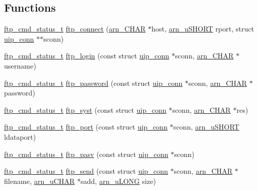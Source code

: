 \subsection*{Functions}
\begin{DoxyCompactItemize}
\item 
\hyperlink{group__ftp_gabd3273961dc774ec260204513c2cea90}{ftp\_\-cmd\_\-status\_\-t} \hyperlink{group__ftp_gad3c366206b639b09543515a6ab6e228e}{ftp\_\-connect} (\hyperlink{group__ftp_gab7c92ee10c15b851350edb8a4a3bb708}{arn\_\-CHAR} $\ast$host, \hyperlink{group__ftp_gaa290e3b930f0eff7f256b787fdbe02dc}{arn\_\-uSHORT} rport, struct \hyperlink{structuip__conn}{uip\_\-conn} $\ast$$\ast$sconn)
\item 
\hyperlink{group__ftp_gabd3273961dc774ec260204513c2cea90}{ftp\_\-cmd\_\-status\_\-t} \hyperlink{group__ftp_ga86522c2e5a4dba5a9213f20c1cb9f31e}{ftp\_\-login} (const struct \hyperlink{structuip__conn}{uip\_\-conn} $\ast$sconn, \hyperlink{group__ftp_gab7c92ee10c15b851350edb8a4a3bb708}{arn\_\-CHAR} $\ast$username)
\item 
\hyperlink{group__ftp_gabd3273961dc774ec260204513c2cea90}{ftp\_\-cmd\_\-status\_\-t} \hyperlink{group__ftp_ga2a15e319137f942818399a1633c536a8}{ftp\_\-password} (const struct \hyperlink{structuip__conn}{uip\_\-conn} $\ast$sconn, \hyperlink{group__ftp_gab7c92ee10c15b851350edb8a4a3bb708}{arn\_\-CHAR} $\ast$password)
\item 
\hyperlink{group__ftp_gabd3273961dc774ec260204513c2cea90}{ftp\_\-cmd\_\-status\_\-t} \hyperlink{group__ftp_gacf99b25830511655f16139c5c4ab73df}{ftp\_\-syst} (const struct \hyperlink{structuip__conn}{uip\_\-conn} $\ast$sconn, \hyperlink{group__ftp_gab7c92ee10c15b851350edb8a4a3bb708}{arn\_\-CHAR} $\ast$res)
\item 
\hyperlink{group__ftp_gabd3273961dc774ec260204513c2cea90}{ftp\_\-cmd\_\-status\_\-t} \hyperlink{group__ftp_ga3dcde404cc2a132e5d4b7307a2dabecc}{ftp\_\-port} (const struct \hyperlink{structuip__conn}{uip\_\-conn} $\ast$sconn, \hyperlink{group__ftp_gaa290e3b930f0eff7f256b787fdbe02dc}{arn\_\-uSHORT} ldataport)
\item 
\hyperlink{group__ftp_gabd3273961dc774ec260204513c2cea90}{ftp\_\-cmd\_\-status\_\-t} \hyperlink{group__ftp_gaeea6048ae27001ac1fd4890e73b0edc4}{ftp\_\-pasv} (const struct \hyperlink{structuip__conn}{uip\_\-conn} $\ast$sconn)
\item 
\hyperlink{group__ftp_gabd3273961dc774ec260204513c2cea90}{ftp\_\-cmd\_\-status\_\-t} \hyperlink{group__ftp_ga1e7b132e2be7304b13ef544fd8a9ce2f}{ftp\_\-send} (const struct \hyperlink{structuip__conn}{uip\_\-conn} $\ast$sconn, \hyperlink{group__ftp_gab7c92ee10c15b851350edb8a4a3bb708}{arn\_\-CHAR} $\ast$filename, \hyperlink{group__ftp_ga748121386e994966f8a87f4160f055b4}{arn\_\-uCHAR} $\ast$sadd, \hyperlink{group__ftp_ga8b49fa3351457a2ef5c6f2b84c227953}{arn\_\-uLONG} size)
$$
\end{DoxyCompactItemize}

